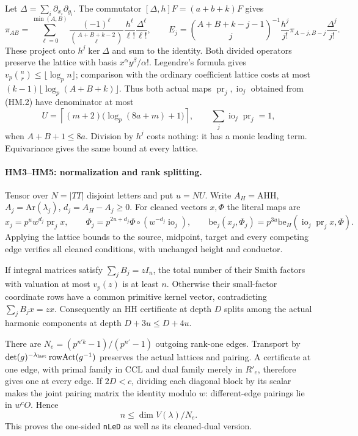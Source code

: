 \documentclass[11pt,a4paper]{article}
\numberwithin{equation}{section}
\theoremstyle{remark}\newtheorem{remark}[theorem]{Remark}
\begin{document}
Let $\Delta=\sum_i\partial_{x_i}\partial_{y_i}$.
The commutator $[\Delta,h]F=(a+b+k)F$ gives
\[
 \pi_{AB}=\sum_{\ell=0}^{\min(A,B)}
 \frac{(-1)^\ell}{\binom{A+B+k-2}{\ell}}
 \frac{h^\ell}{\ell!}\frac{\Delta^\ell}{\ell!},\qquad
 E_j=\binom{A+B+k-j-1}{j}^{-1}
 \frac{h^j}{j!}\pi_{A-j,B-j}\frac{\Delta^j}{j!}.        \tag{HM.2}
\]
These project onto $h^j\ker\Delta$ and sum to the identity.
Both divided operators preserve the lattice with basis
$x^\alpha y^\beta/\alpha!$. Legendre's formula gives
$v_p\binom nr\le\lfloor\log_p n\rfloor$; comparison with the
ordinary coefficient lattice costs at most $(k-1)\lfloor\log_p(A+B+k)\rfloor$.
Thus both actual maps $\operatorname{pr}_j,\operatorname{io}_j$
obtained from (HM.2) have denominator at most
\[
 U=\left\lceil(m+2)\bigl(\log_p(8a+m)+1\bigr)\right\rceil,
 \qquad \sum_j\operatorname{io}_j\operatorname{pr}_j=1,
                                                               \tag{HM.3}
\]
when $A+B+1\le8a$. Division by $h^j$ costs nothing: it has a
monic leading term. Equivariance gives the same bound at every lattice.

\paragraph{HM3--HM5: normalization and rank splitting.}
Tensor over $N=|TT|$ disjoint letters and put $u=NU$.
Write $A_H=\mathrm{AHH}$, $A_j=\mathrm{Ar}(\lambda_j)$,
$d_j=A_H-A_j\ge0$. For cleaned vectors $x,\Phi$ the literal maps are
\[
 x_j=p^u w^{d_j}\operatorname{pr}_jx,\qquad
 \Phi_j=p^{2u+d_j}\Phi\circ(w^{-d_j}\operatorname{io}_j),\qquad
 \mathrm{be}_j(x_j,\Phi_j)
   =p^{3u}\mathrm{be}_H(\operatorname{io}_j\operatorname{pr}_jx,\Phi).
                                                               \tag{HM.4}
\]
Applying the lattice bounds to the source, midpoint, target and every
competing edge verifies all cleaned conditions, with unchanged height
and conductor.

If integral matrices satisfy $\sum_jB_j=zI_n$, the total number of
their Smith factors with valuation at most $v_p(z)$ is at least $n$.
Otherwise their small-factor coordinate rows have a common primitive
kernel vector, contradicting $\sum_jB_jx=zx$.
Consequently an HH certificate at depth $D$ splits among the actual
harmonic components at depth $D+3u\le D+4u$.

There are $N_e=(p^{n'k}-1)/(p^{n'}-1)$ outgoing rank-one edges.
Transport by $\det(g)^{-\lambda_{\rm last}}\operatorname{rowAct}(g^{-1})$
preserves the actual lattices and pairing. A certificate at one edge,
with primal family in $\mathrm{CCL}$ and dual family merely in $R'_e$,
therefore gives one at every edge. If $2D<c$, dividing each diagonal
block by its scalar makes the joint pairing matrix the identity modulo
$w$: different-edge pairings lie in $w^cO$. Hence
\[
                         n\le\dim V(\lambda)/N_e.       \tag{HM.5}
\]
This proves the one-sided \texttt{nLeD} as well as its cleaned-dual version.
\end{document}
